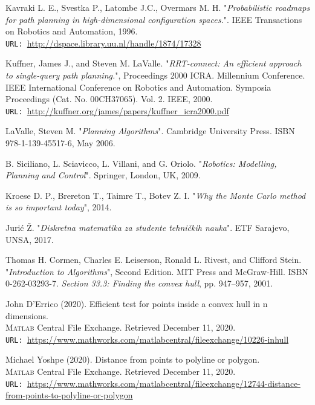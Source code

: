 \documentclass[12pt]{article}
\numberwithin{equation}{section}
\begin{document}
\begin{spacing}{1.5}
\begin{thebibliography}{8}
		Kavraki L. E., Svestka P., Latombe J.C., Overmars M. H. "\textit{Probabilistic roadmaps for path planning in high-dimensional configuration spaces.}". IEEE Transactions on Robotics and Automation, 1996. \\
		\texttt{URL: }\url{http://dspace.library.uu.nl/handle/1874/17328}
		
		Kuffner, James J., and Steven M. LaValle. "\textit{RRT-connect: An efficient approach to single-query path planning.}", Proceedings 2000 ICRA. Millennium Conference. IEEE International Conference on Robotics and Automation. Symposia Proceedings (Cat. No. 00CH37065). Vol. 2. IEEE, 2000. \\
		\texttt{URL: }\url{http://kuffner.org/james/papers/kuffner_icra2000.pdf}
		
		LaValle, Steven M. "\textit{Planning Algorithms}". Cambridge University Press. ISBN 978-1-139-45517-6, May 2006.
		
		B. Siciliano, L. Sciavicco, L. Villani, and G. Oriolo. "\textit{Robotics: Modelling, Planning and Control}". Springer, London, UK, 2009.
		
		Kroese D. P., Brereton T., Taimre T., Botev Z. I. "\textit{Why the Monte Carlo method is so important today}", 2014.
		
		Jurić Ž. "\textit{Diskretna matematika za studente tehničkih nauka}". ETF Sarajevo, UNSA, 2017. 
		
		Thomas H. Cormen, Charles E. Leiserson, Ronald L. Rivest, and Clifford Stein. "\textit{Introduction to Algorithms}", Second Edition. MIT Press and McGraw-Hill. ISBN 0-262-03293-7. \textit{Section 33.3: Finding the convex hull}, pp. 947–957, 2001.
		
		John D'Errico (2020). Efficient test for points inside a convex hull in n dimensions. \\ \textsc{Matlab} Central File Exchange. Retrieved December 11, 2020. \\ \texttt{URL: }\url{https://www.mathworks.com/matlabcentral/fileexchange/10226-inhull}
		
		Michael Yoshpe (2020). Distance from points to polyline or polygon. \\
		\textsc{Matlab} Central File Exchange. Retrieved December 11, 2020. \\ \texttt{URL: }\url{https://www.mathworks.com/matlabcentral/fileexchange/12744-distance-from-points-to-polyline-or-polygon}
		

\end{thebibliography}
\end{spacing}
\end{document}
